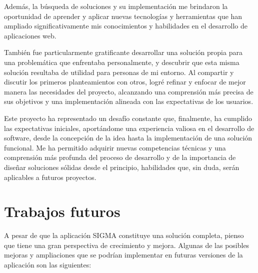 Además, la búsqueda de soluciones y su implementación me brindaron la oportunidad de aprender y aplicar nuevas tecnologías y herramientas que han ampliado significativamente mis conocimientos y habilidades en el desarrollo de aplicaciones web.

También fue particularmente gratificante desarrollar una solución propia para una problemática que enfrentaba personalmente, y descubrir que esta misma solución resultaba de utilidad para personas de mi entorno. Al compartir y discutir los primeros planteamientos con otros, logré refinar y enfocar de mejor manera las necesidades del proyecto, alcanzando una comprensión más precisa de sus objetivos y una implementación alineada con las expectativas de los usuarios.

Este proyecto ha representado un desafío constante que, finalmente, ha cumplido las expectativas iniciales, aportándome una experiencia valiosa en el desarrollo de software, desde la concepción de la idea hasta la implementación de una solución funcional. Me ha permitido adquirir nuevas competencias técnicas y una comprensión más profunda del proceso de desarrollo y de la importancia de diseñar soluciones sólidas desde el principio, habilidades que, sin duda, serán aplicables a futuros proyectos.


\section{Trabajos futuros}
A pesar de que la aplicación SIGMA constituye una solución completa, pienso que tiene una gran perspectiva de crecimiento y mejora. Algunas de las posibles mejoras y ampliaciones que se podrían implementar en futuras versiones de la aplicación son las siguientes:

